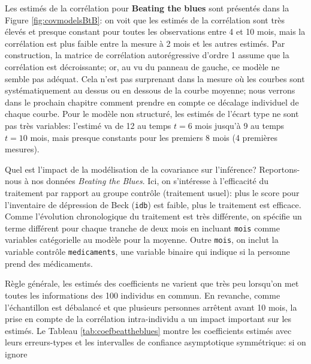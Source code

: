 \documentclass[
  11pt,
  letterpaper,
]{article}
\theoremstyle{definition}
\theoremstyle{definition}
\theoremstyle{definition}
\theoremstyle{definition}
\theoremstyle{remark}
\begin{document}
Les estimés de la corrélation pour \textbf{Beating the blues} sont présentés dans la Figure \ref{fig:covmodelsBtB}: on voit que
les estimés de la corrélation sont très élevés et presque constant pour toutes les observations entre 4 et 10 mois, mais la corrélation est plus faible entre la mesure à 2 mois et les autres estimés. Par construction, la matrice de corrélation autorégressive d'ordre 1 assume que la corrélation est décroissante; or, au vu du panneau de gauche, ce modèle ne semble pas adéquat. Cela n'est pas surprenant dans la mesure où les courbes sont systématiquement au dessus ou en dessous de la courbe moyenne; nous verrons dans le prochain chapitre comment prendre en compte ce décalage individuel de chaque courbe.
Pour le modèle non structuré, les estimés de l'écart type ne sont pas très variables: l'estimé va de 12 au temps \(t=6\) mois jusqu'à 9 au temps \(t=10\) mois, mais presque constants pour les premiers 8 mois (4 premières mesures).

Quel est l'impact de la modélisation de la covariance sur l'inférence? Reportons-nous à nos données \emph{Beating the Blues}. Ici, on s'intéresse à l'efficacité du traitement par rapport au groupe contrôle (traitement usuel): plus le score pour l'inventaire de dépression de Beck (\texttt{idb}) est faible, plus le traitement est efficace. Comme l'évolution chronologique du traitement est très différente, on spécifie un terme différent pour chaque tranche de deux mois en incluant \texttt{mois} comme variables catégorielle au modèle pour la moyenne. Outre \texttt{mois}, on inclut la variable contrôle \texttt{medicaments}, une variable binaire qui indique si la personne prend des médicaments.

Règle générale, les estimés des coefficients ne varient que très peu lorsqu'on met toutes les informations des 100 individus en commun. En revanche, comme l'échantillon est débalancé et que plusieurs personnes arrêtent avant 10 mois, la prise en compte de la corrélation intra-individu a un impact important sur les estimés. Le Tableau \ref{tab:coefbeattheblues} montre les coefficients estimés avec leurs erreurs-types et les intervalles de confiance asymptotique symmétrique: si on ignore
\end{document}
